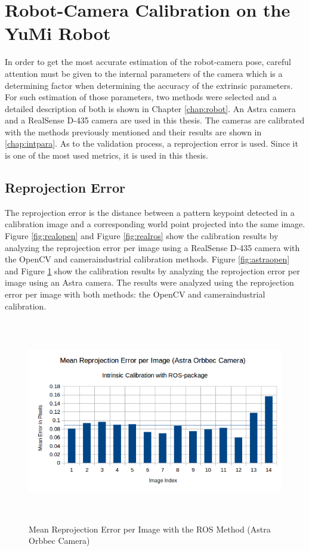 \section{Robot-Camera Calibration on the YuMi Robot}

In order to get the most accurate estimation of the robot-camera pose, careful attention must be given to the internal parameters of the camera which is a determining factor when determining the accuracy of the extrinsic parameters. For such estimation of those parameters, two methods were selected and a detailed description of both is shown in Chapter \ref{chap:robot}. An Astra camera and a RealSense D-435 camera are used in this thesis. The cameras are calibrated with the methods previously mentioned and their results are shown in \ref{chap:intpara}. As to the validation process, a reprojection error is used. Since it is one of the most used metrics,  it is used in this thesis. 

\subsection{Reprojection Error}

The reprojection error is the distance between a pattern keypoint detected in a calibration image and a corresponding world point projected into the same image. Figure \ref{fig:realopen} and Figure \ref{fig:realros} show the calibration results by analyzing the reprojection error per image using a RealSense D-435 camera with the OpenCV and camera\textunderscore industrial calibration methods. Figure \ref{fig:astraopen} and Figure \ref{fig:astraros} show the calibration results by analyzing the reprojection error per image using an Astra camera. The results were analyzed using the reprojection error per image with both methods: the OpenCV and camera\textunderscore industrial calibration.



\begin{figure}[!h]
\begin{center}
\includegraphics[width=5in, height=3.5in]{figures05/int/ros_int_cal_astra.png}
\caption{Mean Reprojection Error per Image with the ROS Method (Astra Orbbec Camera)}%
\label{fig:astraros}
\end{center}
\end{figure}

